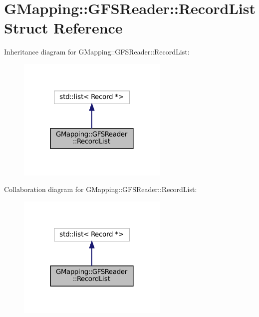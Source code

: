 \hypertarget{structGMapping_1_1GFSReader_1_1RecordList}{}\section{G\+Mapping\+:\+:G\+F\+S\+Reader\+:\+:Record\+List Struct Reference}
\label{structGMapping_1_1GFSReader_1_1RecordList}


Inheritance diagram for G\+Mapping\+:\+:G\+F\+S\+Reader\+:\+:Record\+List\+:
\nopagebreak
\begin{figure}[H]
\begin{center}
\leavevmode
\includegraphics[width=204pt]{structGMapping_1_1GFSReader_1_1RecordList__inherit__graph}
\end{center}
\end{figure}


Collaboration diagram for G\+Mapping\+:\+:G\+F\+S\+Reader\+:\+:Record\+List\+:
\nopagebreak
\begin{figure}[H]
\begin{center}
\leavevmode
\includegraphics[width=204pt]{structGMapping_1_1GFSReader_1_1RecordList__coll__graph}
\end{center}
\end{figure}
